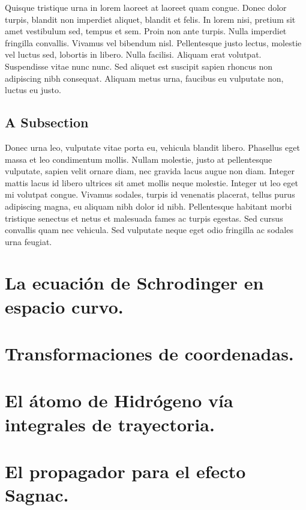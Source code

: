 Quisque tristique urna in lorem laoreet at laoreet quam congue. Donec dolor turpis, blandit non imperdiet aliquet, blandit et felis. In lorem nisi, pretium sit amet vestibulum sed, tempus et sem. Proin non ante turpis. Nulla imperdiet fringilla convallis. Vivamus vel bibendum nisl. Pellentesque justo lectus, molestie vel luctus sed, lobortis in libero. Nulla facilisi. Aliquam erat volutpat. Suspendisse vitae nunc nunc. Sed aliquet est suscipit sapien rhoncus non adipiscing nibh consequat. Aliquam metus urna, faucibus eu vulputate non, luctus eu justo.

\subsection{A Subsection}

Donec urna leo, vulputate vitae porta eu, vehicula blandit libero. Phasellus eget massa et leo condimentum mollis. Nullam molestie, justo at pellentesque vulputate, sapien velit ornare diam, nec gravida lacus augue non diam. Integer mattis lacus id libero ultrices sit amet mollis neque molestie. Integer ut leo eget mi volutpat congue. Vivamus sodales, turpis id venenatis placerat, tellus purus adipiscing magna, eu aliquam nibh dolor id nibh. Pellentesque habitant morbi tristique senectus et netus et malesuada fames ac turpis egestas. Sed cursus convallis quam nec vehicula. Sed vulputate neque eget odio fringilla ac sodales urna feugiat.

\section{La ecuación de Schrodinger en espacio curvo.}

\section{Transformaciones de coordenadas.}
\section{El átomo de Hidrógeno vía integrales de trayectoria.}
\section{El propagador para el efecto Sagnac.}